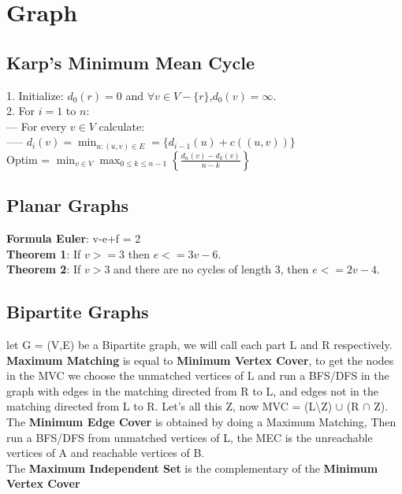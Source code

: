 \chapter{Graph}
\section{Karp's Minimum Mean Cycle}
1. Initialize: $d_0(r) = 0$ and $\forall v\in V - \{r\}$,$d_0(v) = \infty$.\\
2. For $i = 1$ to $n$:\\
--- For every $v\in V$ calculate:\\
----- $d_i(v) = \min_{u:(u,v)\in E} = \{d_{i - 1}(u) + c((u,v))\}$\\
Optim = $\min_{v\in V}\max_{0\leq k\leq n - 1}\left\{\frac{d_n(v) - d_k(v)}{n - k}\right\}$
\section{Planar Graphs}
\textbf{Formula Euler}: v-e+f = 2\\
\textbf{Theorem 1}: If $v>= 3$ then $e<=3v-6$.\\
\textbf{Theorem 2}: If $v>3$ and there are no cycles of length 3, then $e<= 2v-4$.\\

\section{Bipartite Graphs}
let G = (V,E) be a Bipartite graph, we will call each part L and R respectively.\\
\textbf{Maximum Matching} is equal to \textbf{Minimum Vertex Cover}, to get the nodes in the MVC we choose the unmatched vertices of L
and run a BFS/DFS in the graph with edges in the matching directed from R to L, and edges not in the matching directed from L to R. Let's all this Z,
now MVC = (L\textbackslash Z) $\cup$ (R $\cap$ Z). \\
The \textbf{Minimum Edge Cover} is obtained by doing a Maximum Matching, Then run a BFS/DFS from unmatched vertices of L,
the MEC is the unreachable vertices of A and reachable vertices of B.\\
The \textbf{Maximum Independent Set} is the complementary of the \textbf{Minimum Vertex Cover}
